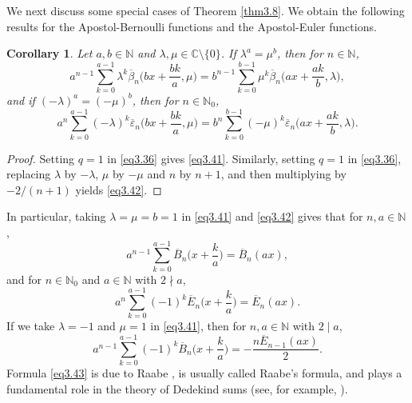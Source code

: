 \documentclass[reqno]{amsart}
\numberwithin{equation}{section}
\newtheorem{corollary}[thm]{Corollary}
\begin{document}
We next discuss some special cases of Theorem \ref{thm3.8}. We obtain the following results for the Apostol-Bernoulli functions and the Apostol-Euler functions.

\begin{corollary}\label{cor3.9} Let $a,b\in\mathbb{N}$ and $\lambda,\mu\in\mathbb{C}\setminus\{0\}$. If $\lambda^{a}=\mu^{b}$, then for $n\in\mathbb{N}$,
\begin{equation}\label{eq3.41}
a^{n-1}\sum_{k=0}^{a-1}\lambda^{k}\overline{\beta}_{n}\biggl(bx+\frac{bk}{a},\mu\biggl)=b^{n-1}\sum_{k=0}^{b-1}\mu^{k}\overline{\beta}_{n}\biggl(ax+\frac{ak}{b},\lambda\biggl),
\end{equation}
and if $(-\lambda)^{a}=(-\mu)^{b}$, then for $n\in\mathbb{N}_{0}$,
\begin{equation}\label{eq3.42}
a^{n}\sum_{k=0}^{a-1}(-\lambda)^{k}\overline{\varepsilon}_{n}\biggl(bx+\frac{bk}{a},\mu\biggl)=b^{n}\sum_{k=0}^{b-1}(-\mu)^{k}\overline{\varepsilon}_{n}\biggl(ax+\frac{ak}{b},\lambda\biggl).
\end{equation}
\end{corollary}

\begin{proof}
Setting $q=1$ in \eqref{eq3.36} gives \eqref{eq3.41}. Similarly, setting $q=1$ in \eqref{eq3.36}, replacing $\lambda$ by $-\lambda$, $\mu$ by $-\mu$ and $n$ by $n+1$, and then multiplying by
$-2/(n+1)$ yields \eqref{eq3.42}.
\end{proof}

In particular, taking $\lambda=\mu=b=1$ in \eqref{eq3.41} and \eqref{eq3.42} gives that for $n,a\in\mathbb{N}$,
\begin{equation}\label{eq3.43}
a^{n-1}\sum_{k=0}^{a-1}\overline{B}_{n}\biggl(x+\frac{k}{a}\biggl)=\overline{B}_{n}(ax),
\end{equation}
and for $n\in\mathbb{N}_{0}$ and $a\in\mathbb{N}$ with $2\nmid a$,
\begin{equation}\label{eq3.44}
a^{n}\sum_{k=0}^{a-1}(-1)^{k}\overline{E}_{n}\biggl(x+\frac{k}{a}\biggl)=\overline{E}_{n}(ax).
\end{equation}
If we take $\lambda=-1$ and $\mu=1$ in \eqref{eq3.41}, then for $n,a\in\mathbb{N}$ with $2\mid a$,
\begin{equation}\label{eq3.45}
a^{n-1}\sum_{k=0}^{a-1}(-1)^{k}\overline{B}_{n}\biggl(x+\frac{k}{a}\biggl)=-\frac{n\overline{E}_{n-1}(ax)}{2}.
\end{equation}
Formula \eqref{eq3.43} is due to Raabe \cite{raabe}, is usually called Raabe's formula, and plays a fundamental role in the theory of Dedekind sums (see, for example, \cite{bayad1,carlitz,hall,he2}).
\end{document}
